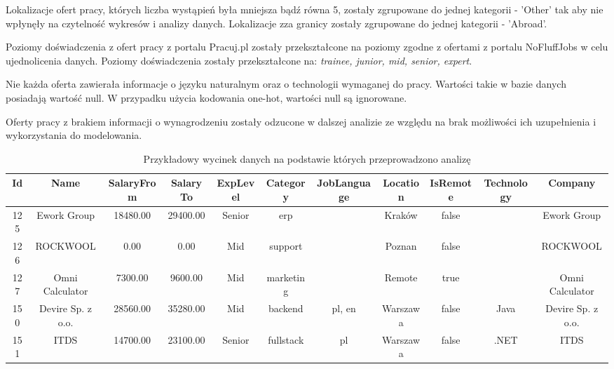\documentclass{article}
\begin{document}
Lokalizacje ofert pracy, których liczba wystąpień była mniejsza bądź równa 5, zostały
zgrupowane do jednej kategorii - 'Other' tak aby nie wpłynęły na czytelność wykresów i analizy danych.
Lokalizacje zza granicy zostały zgrupowane do jednej kategorii - 'Abroad'.

Poziomy doświadczenia z ofert pracy z portalu Pracuj.pl zostały przekształcone na poziomy zgodne z ofertami z portalu NoFluffJobs w celu ujednolicenia danych.
Poziomy doświadczenia zostały przekształcone na: \textit{trainee, junior, mid, senior, expert}.

Nie każda oferta zawierała informacje o języku naturalnym oraz o technologii wymaganej do pracy. Wartości takie w bazie danych posiadają wartość null.
W przypadku użycia kodowania one-hot, wartości null są ignorowane.

Oferty pracy z brakiem informacji o wynagrodzeniu zostały odzucone w dalszej analizie ze względu na brak możliwości ich uzupełnienia i wykorzystania do modelowania.

\begin{table}[H]
    \centering
    \begin{adjustbox}{width=1.1\textwidth}
        \begin{tabular}{|c|c|c|c|c|c|c|c|c|c|c|}
            \hline
            \textbf{Id} & \textbf{Name}     & \textbf{SalaryFrom} & \textbf{SalaryTo} & \textbf{ExpLevel} & \textbf{Category} & \textbf{JobLanguage} & \textbf{Location} & \textbf{IsRemote} & \textbf{Technology} & \textbf{Company}  \\ \hline
            125         & Ework Group       & 18480.00            & 29400.00          & Senior            & erp               &                      & Kraków            & false             &                     & Ework Group       \\ \hline
            126         & ROCKWOOL          & 0.00                & 0.00              & Mid               & support           &                      & Poznan            & false             &                     & ROCKWOOL          \\ \hline
            127         & Omni Calculator   & 7300.00             & 9600.00           & Mid               & marketing         &                      & Remote            & true              &                     & Omni Calculator   \\ \hline
            150         & Devire Sp. z o.o. & 28560.00            & 35280.00          & Mid               & backend           & pl, en               & Warszawa          & false             & Java                & Devire Sp. z o.o. \\ \hline
            151         & ITDS              & 14700.00            & 23100.00          & Senior            & fullstack         & pl                   & Warszawa          & false             & .NET                & ITDS              \\ \hline
        \end{tabular}
    \end{adjustbox}
    \caption{Przykładowy wycinek danych na podstawie których przeprowadzono analizę}
    \label{tab:oferty}
\end{table}
\end{document}
